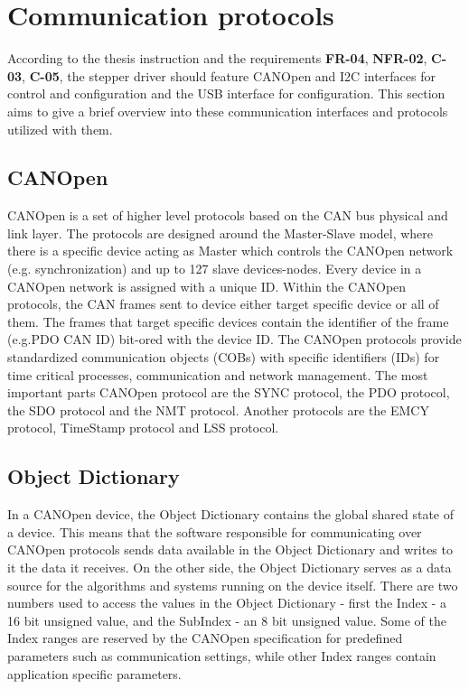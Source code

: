 \section{Communication protocols}
\label{sec:comm_protocols}
According to the thesis instruction and the requirements \textbf{FR-04}, \textbf{NFR-02}, \textbf{C-03}, \textbf{C-05},  the stepper driver should feature CANOpen and I2C interfaces for control and configuration and the USB interface for configuration.
This section aims to give a brief overview into these communication interfaces and protocols utilized with them.

\subsection{CANOpen}
\label{subsec:canopen}
CANOpen is a set of higher level protocols based on the CAN bus physical and link layer.
The protocols are designed around the Master-Slave model, where there is a specific device acting as Master which controls the CANOpen network (e.g. synchronization) and up to 127 slave devices-nodes.
Every device in a CANOpen network is assigned with a unique ID.
Within the CANOpen protocols, the CAN frames sent to device either target specific device or all of them.
The frames that target specific devices contain the identifier of the frame (e.g.PDO CAN ID) bit-ored with the device ID.
The CANOpen protocols provide standardized communication objects (COBs) with specific identifiers (IDs) for time critical processes, communication and network management\cite{can_in_automation_can_2021}.
The most important parts CANOpen protocol are the SYNC protocol, the PDO protocol, the SDO protocol and the NMT protocol.
Another protocols are the EMCY protocol, TimeStamp protocol and LSS protocol.

\subsection{Object Dictionary}
\label{subsec:object_dictionary}
In a CANOpen device, the Object Dictionary contains the global shared state of a device.
This means that the software responsible for communicating over CANOpen protocols sends data available in the Object Dictionary and writes to it the data it receives.
On the other side, the Object Dictionary serves as a data source for the algorithms and systems running on the device itself.
There are two numbers used to access the values in the Object Dictionary - first the Index - a 16 bit unsigned value, and the SubIndex - an 8 bit unsigned value.
Some of the Index ranges are reserved by the CANOpen specification for predefined parameters such as communication settings, while other Index ranges contain application specific parameters\cite{can_in_automation_can_2021}.

